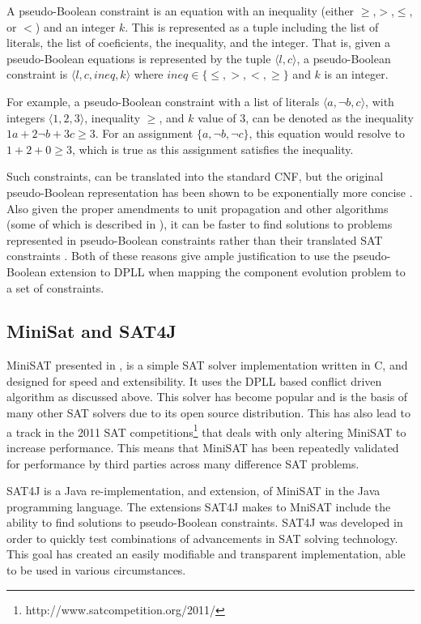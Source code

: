 A pseudo-Boolean constraint is an equation with an inequality (either $\geq$,$>$,$\leq$, or $<$) and an integer $k$.
This is represented as a tuple including the list of literals, the list of coeficients, the inequality, and the integer.
That is, given a pseudo-Boolean equations is represented by the tuple $\langle l, c \rangle$, a pseudo-Boolean constraint is $\langle l,c,ineq,k \rangle$
where $ineq \in \{\leq,>,<,\geq\}$ and $k$ is an integer.

For example, a pseudo-Boolean constraint with a list of literals $\langle a, \neg b , c\rangle$, with integers $\langle 1, 2, 3\rangle$, inequality $\geq$, and $k$ value of $3$,
can be denoted as the inequality $1a + 2 \neg b + 3c \geq 3$.
For an assignment $\{a , \neg b, \neg c\}$, this equation would resolve to $1 + 2 + 0 \geq 3$, which is true as this assignment satisfies the inequality.

Such constraints, can be translated into the standard CNF, but the original pseudo-Boolean representation has been shown to be exponentially more concise \citep{dixon2004automating}.
Also given the proper amendments to unit propagation and other algorithms (some of which is described in \cite{Sheini2006}), 
it can be faster to find solutions to problems represented in pseudo-Boolean constraints rather than their translated SAT constraints \citep{dixon2004automating}.
Both of these reasons give ample justification to use the pseudo-Boolean extension to DPLL when mapping the component evolution problem to a set of constraints. 

\subsection{MiniSat and SAT4J}
MiniSAT presented in \cite{een2003}, is a simple SAT solver implementation written in C, and designed for speed and extensibility.
It uses the DPLL based conflict driven algorithm as discussed above.
This solver has become popular and is the basis of many other SAT solvers due to its open source distribution.
This has also lead to a track in the 2011 SAT competitions\footnote{http://www.satcompetition.org/2011/} that deals with only altering MiniSAT to increase performance.
This means that MiniSAT has been repeatedly validated for performance by third parties across many difference SAT problems. 

SAT4J \citep{le2010sat4j} is a Java re-implementation, and extension, of MiniSAT in the Java programming language.
The extensions SAT4J makes to MniSAT include the ability to find solutions to pseudo-Boolean constraints.
SAT4J was developed in order to quickly test combinations of advancements in SAT solving technology.
This goal has created an easily modifiable and transparent implementation, able to be used in various circumstances.

